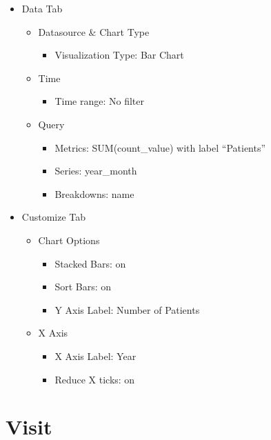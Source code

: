 \documentclass[
]{book}
\providecommand{\tightlist}{%
  \setlength{\itemsep}{0pt}\setlength{\parskip}{0pt}}
\begin{document}
\begin{itemize}
\item
  Data Tab

  \begin{itemize}
  \item
    Datasource \& Chart Type

    \begin{itemize}
    \tightlist
    \item
      Visualization Type: Bar Chart
    \end{itemize}
  \item
    Time

    \begin{itemize}
    \tightlist
    \item
      Time range: No filter
    \end{itemize}
  \item
    Query

    \begin{itemize}
    \item
      Metrics: SUM(count\_value) with label ``Patients''
    \item
      Series: year\_month
    \item
      Breakdowns: name
    \end{itemize}
  \end{itemize}
\item
  Customize Tab

  \begin{itemize}
  \item
    Chart Options

    \begin{itemize}
    \item
      Stacked Bars: on
    \item
      Sort Bars: on
    \item
      Y Axis Label: Number of Patients
    \end{itemize}
  \item
    X Axis

    \begin{itemize}
    \item
      X Axis Label: Year
    \item
      Reduce X ticks: on
    \end{itemize}
  \end{itemize}
\end{itemize}

\hypertarget{visit}{%
\chapter{Visit}\label{visit}}
\end{document}
